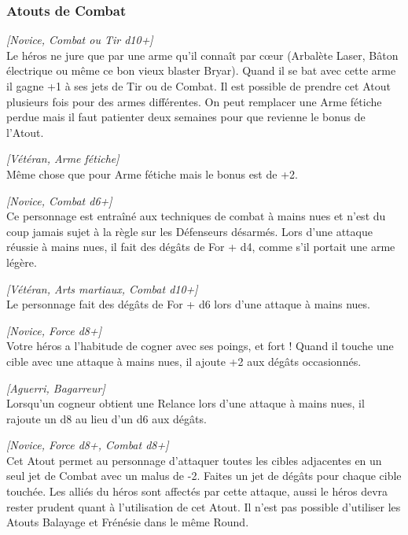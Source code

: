 \subsubsection{Atouts de Combat}
\begin{description}[align=left]
    \item [Arme fétiche]
    	\emph{[Novice, Combat ou Tir d10+]}\\
        Le héros ne jure que par une arme qu’il connaît par c\oe{ur} (Arbalète Laser, Bâton électrique ou même ce bon vieux blaster Bryar). Quand il se bat avec cette arme il gagne +1 à ses jets de Tir ou de Combat. Il est possible de prendre cet Atout plusieurs fois pour des armes différentes. On peut remplacer une Arme fétiche perdue mais il faut patienter deux semaines pour que revienne le bonus de l’Atout.

    \item [Arme fétiche adorée]
    	\emph{[Vétéran, Arme fétiche]}\\
        Même chose que pour Arme fétiche mais le bonus est de +2.

    \item [Arts martiaux]
    	\emph{[Novice, Combat d6+]}\\
        Ce personnage est entraîné aux techniques de combat à mains nues et n’est du coup jamais sujet à la règle sur les Défenseurs désarmés. Lors d’une attaque réussie à mains nues, il fait des dégâts de For + d4, comme s’il portait une arme légère.

    \item [Maître des arts martiaux]
    	\emph{[Vétéran, Arts martiaux, Combat d10+]}\\
        Le personnage fait des dégâts de For + d6 lors d’une attaque à mains nues.

    \item [Bagarreur]
    	\emph{[Novice, Force d8+]}\\
        Votre héros a l’habitude de cogner avec ses poings, et fort ! Quand il touche une cible avec une attaque à mains nues, il ajoute +2 aux dégâts occasionnés.

    \item [Cogneur]
    	\emph{[Aguerri, Bagarreur]}\\
        Lorsqu’un cogneur obtient une Relance lors d’une attaque à mains nues, il rajoute un d8 au lieu d’un d6 aux dégâts.

    \item [Balayage]
    	\emph{[Novice, Force d8+, Combat d8+]}\\
        Cet Atout permet au personnage d’attaquer toutes les cibles adjacentes en un seul jet de Combat avec un malus de -2. Faites un jet de dégâts pour chaque cible touchée. Les alliés du héros sont affectés par cette attaque, aussi le héros devra rester prudent quant à l’utilisation de cet Atout. Il n’est pas possible d’utiliser les Atouts Balayage et Frénésie dans le même Round.


\end{description}
